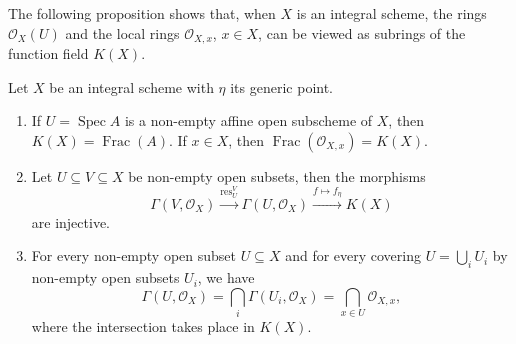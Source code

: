 \documentclass[12pt]{book}
\theoremstyle{definition}
\DeclareMathOperator\Frac{Frac}
\newcommand{\res}{\operatorname{res}}
\DeclareMathOperator{\Spec}{Spec}
\begin{document}
	The following proposition shows that, when $X$ is an integral scheme, the rings $\mathcal{O}_X(U)$ and the local rings $\mathcal{O}_{X, x}$, $x \in X$, can be viewed as subrings of the function field $K(X)$.
	
	\begin{proposition}
		Let $X$ be an integral scheme with $\eta$ its generic point.
		\begin{enumerate}
			\item If $U = \Spec A$ is a non-empty affine open subscheme of $X$, then $K(X) = \Frac(A)$. If $x \in X$, then $\Frac(\mathcal{O}_{X, x}) = K(X)$.
			
			\item Let $U \subseteq V \subseteq X$ be non-empty open subsets, then the morphisms
			\begin{equation*}
				\Gamma(V, \mathcal{O}_X) \xrightarrow{\res^V_U} \Gamma(U, \mathcal{O}_X) \xrightarrow{f \mapsto f_\eta} K(X)
			\end{equation*}
			are injective.
			
			\item For every non-empty open subset $U \subseteq X$ and for every covering $U = \bigcup_i U_i$ by non-empty open subsets $U_i$, we have
			\begin{equation*}
				\Gamma(U, \mathcal{O}_X) = \bigcap_{i} \Gamma(U_i, \mathcal{O}_X) = \bigcap_{x \in U} \mathcal{O}_{X, x},
			\end{equation*}
			where the intersection takes place in $K(X)$.
		\end{enumerate}
	\end{proposition}
	
\end{document}
